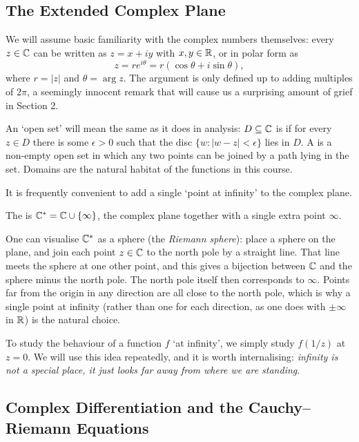 \documentclass[a4paper]{scrartcl}
\begin{document}
\subsection{The Extended Complex Plane}

We will assume basic familiarity with the complex numbers themselves: every $z \in \mathbb{C}$ can be written as $z = x + iy$ with $x, y \in \mathbb{R}$, or in polar form as
$$
z = re^{i\theta} = r(\cos \theta + i \sin \theta),
$$
where $r = |z|$ and $\theta = \arg z$. The argument is only defined up to adding multiples of $2\pi$, a seemingly innocent remark that will cause us a surprising amount of grief in Section 2.

An `open set' will mean the same as it does in analysis: $D \subseteq \mathbb{C}$ is  if for every $z \in D$ there is some $\epsilon > 0$ such that the disc $\{w : |w - z| < \epsilon\}$ lies in $D$. A  is a non-empty open set in which any two points can be joined by a path lying in the set. Domains are the natural habitat of the functions in this course.

It is frequently convenient to add a single `point at infinity' to the complex plane.

\begin{definition}
	The  is $\mathbb{C}^* = \mathbb{C} \cup \{\infty\}$, the complex plane together with a single extra point $\infty$.
\end{definition}

One can visualise $\mathbb{C}^*$ as a sphere (the \emph{Riemann sphere}): place a sphere on the plane, and join each point $z \in \mathbb{C}$ to the north pole by a straight line. That line meets the sphere at one other point, and this gives a bijection between $\mathbb{C}$ and the sphere minus the north pole. The north pole itself then corresponds to $\infty$. Points far from the origin in any direction are all close to the north pole, which is why a single point at infinity (rather than one for each direction, as one does with $\pm\infty$ in $\mathbb{R}$) is the natural choice.

To study the behaviour of a function $f$ `at infinity', we simply study $f(1/z)$ at $z = 0$. We will use this idea repeatedly, and it is worth internalising: \emph{infinity is not a special place, it just looks far away from where we are standing}.

\subsection{Complex Differentiation and the Cauchy--Riemann Equations}
\end{document}
